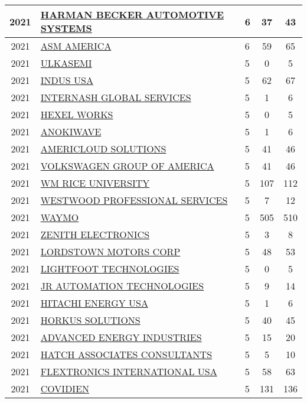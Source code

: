 \documentclass{article}%
\begin{document}
\begin{longtable}{c|p{20em}|p{5em}|c|c}
\hline%
2021&\hyperref[subsec:HARMANBECKERAUTOMOTIVESYSTEMS]{HARMAN BECKER AUTOMOTIVE SYSTEMS}&6&37&43\\%
\hline%
2021&\hyperref[subsec:ASMAMERICA]{ASM AMERICA}&6&59&65\\%
\hline%
2021&\hyperref[subsec:ULKASEMI]{ULKASEMI}&5&0&5\\%
\hline%
2021&\hyperref[subsec:INDUSUSA]{INDUS USA}&5&62&67\\%
\hline%
2021&\hyperref[subsec:INTERNASHGLOBALSERVICES]{INTERNASH GLOBAL SERVICES}&5&1&6\\%
\hline%
2021&\hyperref[subsec:HEXELWORKS]{HEXEL WORKS}&5&0&5\\%
\hline%
2021&\hyperref[subsec:ANOKIWAVE]{ANOKIWAVE}&5&1&6\\%
\hline%
2021&\hyperref[subsec:AMERICLOUDSOLUTIONS]{AMERICLOUD SOLUTIONS}&5&41&46\\%
\hline%
2021&\hyperref[subsec:VOLKSWAGENGROUPOFAMERICA]{VOLKSWAGEN GROUP OF AMERICA}&5&41&46\\%
\hline%
2021&\hyperref[subsec:WMRICEUNIVERSITY]{WM RICE UNIVERSITY}&5&107&112\\%
\hline%
2021&\hyperref[subsec:WESTWOODPROFESSIONALSERVICES]{WESTWOOD PROFESSIONAL SERVICES}&5&7&12\\%
\hline%
2021&\hyperref[subsec:WAYMO]{WAYMO}&5&505&510\\%
\hline%
2021&\hyperref[subsec:ZENITHELECTRONICS]{ZENITH ELECTRONICS}&5&3&8\\%
\hline%
2021&\hyperref[subsec:LORDSTOWNMOTORSCORP]{LORDSTOWN MOTORS CORP}&5&48&53\\%
\hline%
2021&\hyperref[subsec:LIGHTFOOTTECHNOLOGIES]{LIGHTFOOT TECHNOLOGIES}&5&0&5\\%
\hline%
2021&\hyperref[subsec:JRAUTOMATIONTECHNOLOGIES]{JR AUTOMATION TECHNOLOGIES}&5&9&14\\%
\hline%
2021&\hyperref[subsec:HITACHIENERGYUSA]{HITACHI ENERGY USA}&5&1&6\\%
\hline%
2021&\hyperref[subsec:HORKUSSOLUTIONS]{HORKUS SOLUTIONS}&5&40&45\\%
\hline%
2021&\hyperref[subsec:ADVANCEDENERGYINDUSTRIES]{ADVANCED ENERGY INDUSTRIES}&5&15&20\\%
\hline%
2021&\hyperref[subsec:HATCHASSOCIATESCONSULTANTS]{HATCH ASSOCIATES CONSULTANTS}&5&5&10\\%
\hline%
2021&\hyperref[subsec:FLEXTRONICSINTERNATIONALUSA]{FLEXTRONICS INTERNATIONAL USA}&5&58&63\\%
\hline%
2021&\hyperref[subsec:COVIDIEN]{COVIDIEN}&5&131&136\\%

\end{longtable}
\end{document}
